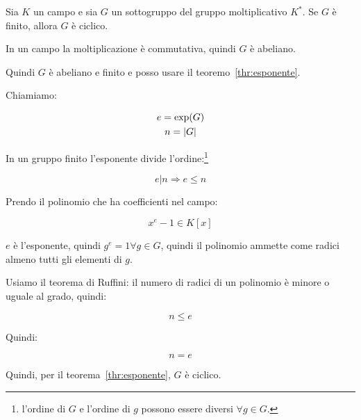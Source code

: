 \begin{teorema}
	Sia $K$ un campo e sia $G$ un sottogruppo del gruppo moltiplicativo $K^*$. Se $G$ è finito, allora $G$ è ciclico.
\end{teorema}
\begin{dimostrazione}
	In un campo la moltiplicazione è commutativa, quindi $G$ è abeliano.
	
	Quindi $G$ è abeliano e finito e posso usare il teoremo~\ref{thr:esponente}.
	
	Chiamiamo:
	
	\begin{gather}
		e = \exp(G) \\
		n = \lvert G \rvert
	\end{gather}

	In un gruppo finito l'esponente divide l'ordine:\footnote{l'ordine di $G$ e l'ordine di $g$ possono essere diversi $\forall g \in G$.}
	
	\begin{equation}
		e|n \Longrightarrow e \le n
	\end{equation}

	Prendo il polinomio che ha coefficienti nel campo:
	
	\begin{equation}
		x^e - 1 \in K[x]
	\end{equation}

	$e$ è l'esponente, quindi $g^e = 1 \forall g \in G$, quindi il polinomio ammette come radici almeno tutti gli elementi di $g$.
	
	Usiamo il teorema di Ruffini: il numero di radici di un polinomio è minore o uguale al grado, quindi:
	
	\begin{equation}
		n \le e
	\end{equation}

	Quindi:
	
	\begin{equation}
		n = e
	\end{equation}

	Quindi, per il teorema~\ref{thr:esponente}, $G$ è ciclico.
\end{dimostrazione}

